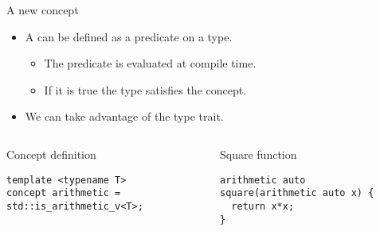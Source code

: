 \begin{frame}[t,fragile]{A new concept}
\begin{itemize}
  \item A  can be defined as a predicate on a type.
    \begin{itemize}
      \item The predicate is evaluated at compile time.
      \item If it is true the type satisfies the concept.
    \end{itemize}

  \item We can take advantage of the  type trait.
\end{itemize}

\begin{columns}[T]

\begin{block}{Concept definition}
\begin{lstlisting}
template <typename T>
concept arithmetic = std::is_arithmetic_v<T>;
\end{lstlisting}
\end{block}

\pause
{}
\begin{block}{Square function}
\begin{lstlisting}
arithmetic auto square(arithmetic auto x) {
  return x*x;
}
\end{lstlisting}
\end{block}

\end{columns}
\end{frame}

